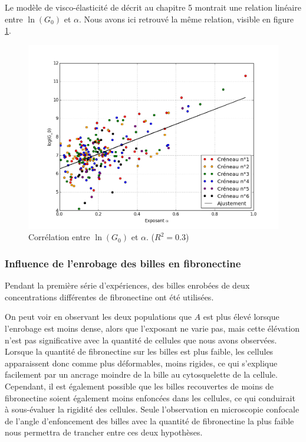 Le modèle de visco-élasticité de \cite{balland_power_2006} décrit au chapitre 5 montrait une relation linéaire entre $\ln(G_0)$ et $\alpha$. Nous avons ici retrouvé la même relation, visible en figure \ref{lnG0}. 

\begin{figure}
\includegraphics[scale=0.4]{Figures/lnG0_vs_alpha.png} 
\caption{Corrélation entre $\ln(G_0)$ et $\alpha$.\label{lnG0} ($R^2=0.3$)}
\end{figure}


\subsubsection{Influence de l'enrobage des billes en fibronectine}

Pendant la première série d'expériences, des billes enrobées de deux concentrations différentes de fibronectine ont été utilisées. 

On peut voir en observant les deux populations que $A$ est plus élevé lorsque l'enrobage est moins dense, alors que l'exposant ne varie pas, mais cette élévation n'est pas significative avec la quantité de cellules que nous avons observées.
Lorsque la quantité de fibronectine sur les billes est plus faible, les cellules apparaissent donc comme plus déformables, moins rigides, ce qui s'explique facilement par un ancrage moindre de la bille au cytosquelette de la cellule.  Cependant, il est également possible que les billes recouvertes de moins de fibronectine soient également moins enfoncées dans les cellules, ce qui conduirait à sous-évaluer la rigidité des cellules. Seule l'observation en microscopie confocale de l'angle d'enfoncement des billes avec la quantité de fibronectine la plus faible nous permettra de trancher entre ces deux hypothèses. 


